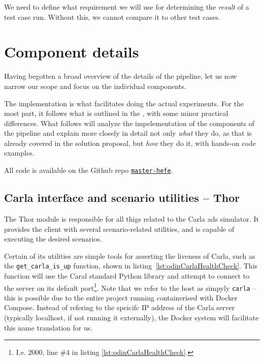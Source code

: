 We need to define what requirement we will use for determining the \textit{result} of a test case
run. Without this, we cannot compare it to other test cases.

\section{Component details}

Having begotten a broad overview of the details of the \hefe pipeline, let us now narrow our scope
and focus on the individual components.



The implementation is what facilitates doing the actual experiments. For the
most part, it follows what is outlined in the , with
some minor practical differences.
What follows will analyze the impelementation of the components of the \hefe{}
pipeline and explain more closely in detail not only \emph{what} they do, as
that is already covered in the solution proposal, but \emph{how} they do it, with
hands-on code examples.

All code is available on the Github repo \href{https://github.com/orjahren/master-hefe}{\texttt{master-hefe}}.

\subsection{Carla interface and scenario utilities -- Thor}

The Thor module is responsible for all thigs related to the Carla \acrshort{ads}
simulator. It provides the client with several scenario-related utilities, and
is capable of executing the desired scenarios.


Certain of its utilities are simple tools for asserting the liveness of Carla,
such as the \texttt{get\_carla\_is\_up} function, shown in
listing~\ref{lst:odinCarlaHealthCheck}. This function will use the Caral
standard Python library and attempt to connect to the server on its default
port\footnote{I.e. \num{2000}, line \#4 in listing
    \ref{lst:odinCarlaHealthCheck}.}. Note that we refer to the host as simpyly
\texttt{carla} -- this is possible due to the entire project running
containerised with Docker Compose. Instead of refering to the speicifc IP
address of the Carla server (typically localhost, if not running it externally),
the Docker system will facilitate this name translation for us.

